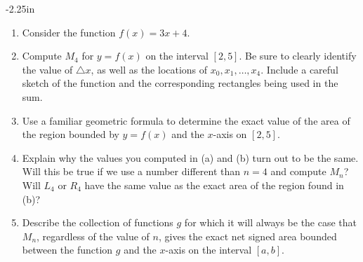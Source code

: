 \begin{adjustwidth*}{}{-2.25in}
\begin{multicols*}{2}
\begin{enumerate}[1),resume]
  \item Consider the function $f(x) = 3x + 4$.
  \ba
  	\item Compute $M_4$ for $y=f(x)$ on the interval $[2,5]$.  Be sure to clearly identify the value of $\triangle x$, as well as the locations of $x_0, x_1, \ldots, x_4$.  Include a careful sketch of the function and the corresponding rectangles being used in the sum.
	\item Use a familiar geometric formula to determine the exact value of the area of the region bounded by $y = f(x)$ and the $x$-axis on $[2,5]$.
	\item Explain why the values you computed in (a) and (b) turn out to be the same.  Will this be true if we use a number different than $n = 4$ and compute $M_n$?  Will $L_4$ or $R_4$ have the same value as the exact area of the region found in (b)?
	\item Describe the collection of functions $g$ for which it will always be the case that $M_n$, regardless of the value of $n$, gives the exact net signed area bounded between the function $g$ and the $x$-axis on the interval $[a,b]$.
  \ea	
\end{enumerate}

\end{multicols*}
\end{adjustwidth*}

\clearpage

